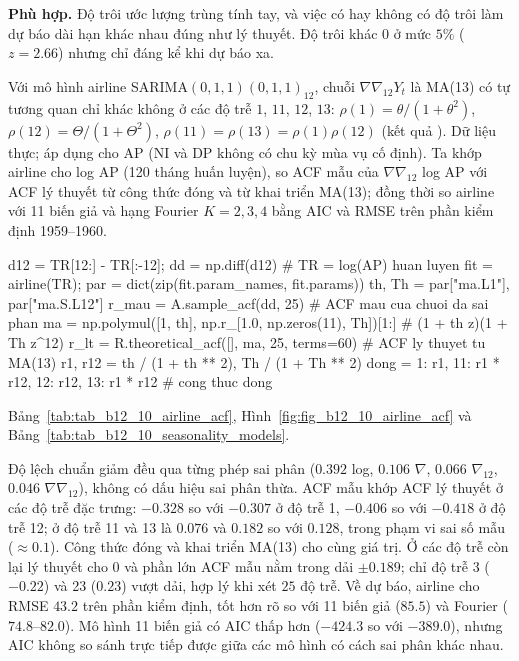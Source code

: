  \textbf{Phù hợp.} Độ trôi ước lượng trùng tính tay, và việc có hay không có độ trôi làm dự báo dài hạn khác nhau đúng như lý thuyết. Độ trôi khác $0$ ở mức $5\%$ ($z=2.66$) nhưng chỉ đáng kể khi dự báo xa.

 Với mô hình airline SARIMA$(0,1,1)(0,1,1)_{12}$, chuỗi $\nabla\nabla_{12}Y_t$ là MA(13) có tự tương quan chỉ khác không ở các độ trễ $1$, $11$, $12$, $13$: $\rho(1)=\theta/(1+\theta^2)$, $\rho(12)=\Theta/(1+\Theta^2)$, $\rho(11)=\rho(13)=\rho(1)\rho(12)$ (kết quả ).
 Dữ liệu thực; áp dụng cho AP (NI và DP không có chu kỳ mùa vụ cố định). Ta khớp airline cho log AP (120 tháng huấn luyện), so ACF mẫu của $\nabla\nabla_{12}$ log AP với ACF lý thuyết từ công thức đóng và từ khai triển MA(13); đồng thời so airline với 11 biến giả và hạng Fourier $K=2,3,4$ bằng AIC và RMSE trên phần kiểm định 1959--1960.
\begin{codeblock}
d12 = TR[12:] - TR[:-12]; dd = np.diff(d12)                    # TR = log(AP) huan luyen
fit = airline(TR); par = dict(zip(fit.param_names, fit.params))
th, Th = par["ma.L1"], par["ma.S.L12"]
r_mau = A.sample_acf(dd, 25)                           # ACF mau cua chuoi da sai phan
ma = np.polymul([1, th], np.r_[1.0, np.zeros(11), Th])[1:]     # (1 + th z)(1 + Th z^12)
r_lt = R.theoretical_acf([], ma, 25, terms=60)          # ACF ly thuyet tu MA(13)
r1, r12 = th / (1 + th ** 2), Th / (1 + Th ** 2)
dong = {1: r1, 11: r1 * r12, 12: r12, 13: r1 * r12}     # cong thuc dong
\end{codeblock}
 Bảng~\ref{tab:tab_b12_10_airline_acf}, Hình~\ref{fig:fig_b12_10_airline_acf} và Bảng~\ref{tab:tab_b12_10_seasonality_models}.


 Độ lệch chuẩn giảm đều qua từng phép sai phân ($0.392$ log, $0.106$ $\nabla$, $0.066$ $\nabla_{12}$, $0.046$ $\nabla\nabla_{12}$), không có dấu hiệu sai phân thừa. ACF mẫu khớp ACF lý thuyết ở các độ trễ đặc trưng: $-0.328$ so với $-0.307$ ở độ trễ 1, $-0.406$ so với $-0.418$ ở độ trễ 12; ở độ trễ 11 và 13 là $0.076$ và $0.182$ so với $0.128$, trong phạm vi sai số mẫu ($\approx0.1$). Công thức đóng và khai triển MA(13) cho cùng giá trị. Ở các độ trễ còn lại lý thuyết cho $0$ và phần lớn ACF mẫu nằm trong dải $\pm0.189$; chỉ độ trễ 3 ($-0.22$) và 23 ($0.23$) vượt dải, hợp lý khi xét $25$ độ trễ. Về dự báo, airline cho RMSE $43.2$ trên phần kiểm định, tốt hơn rõ so với 11 biến giả ($85.5$) và Fourier ($74.8$--$82.0$). Mô hình 11 biến giả có AIC thấp hơn ($-424.3$ so với $-389.0$), nhưng AIC không so sánh trực tiếp được giữa các mô hình có cách sai phân khác nhau.


